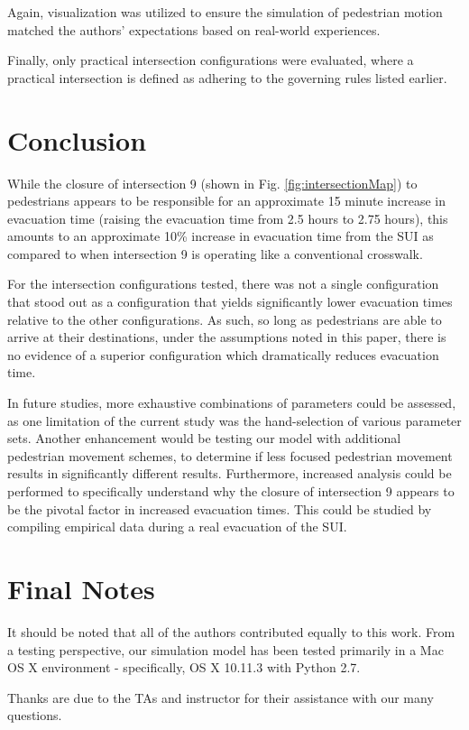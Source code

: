 \documentclass[12pt]{article}
\begin{document}
Again, visualization was utilized to ensure the simulation of pedestrian
motion matched the authors' expectations based on real-world experiences.

Finally, only practical intersection configurations were evaluated, where a practical
intersection is defined as adhering to the governing rules listed earlier.

\section{Conclusion}
While the closure of intersection 9 (shown in Fig. \ref{fig:intersectionMap})
to pedestrians appears to be responsible for an approximate 15 minute increase
in evacuation time (raising the evacuation time from 2.5 hours to 2.75 hours),
this amounts to an approximate 10\% increase in evacuation time from the SUI
as compared to when intersection 9 is operating like a conventional crosswalk.

For the intersection configurations tested, there was not a single configuration
that stood out as a configuration that yields significantly lower evacuation
times relative to the other configurations.  As such, so long as pedestrians are able
to arrive at their destinations, under the assumptions noted in this paper,
there is no evidence of a superior configuration which dramatically reduces
evacuation time.

In future studies, more exhaustive combinations of parameters could be
assessed, as one limitation of the current study was the hand-selection of
various parameter sets. Another enhancement would be testing our model with
additional pedestrian movement schemes, to determine if less focused pedestrian
movement results in significantly different results. Furthermore, increased
analysis could be performed to specifically understand why the closure of
intersection 9 appears to be the pivotal factor in increased evacuation times.
This could be studied by compiling empirical data during a real evacuation of
the SUI.

\section{Final Notes}
It should be noted that all of the authors contributed equally to this work.
From a testing perspective, our simulation model has been tested primarily in
a Mac OS X environment - specifically, OS X 10.11.3 with Python 2.7.

Thanks are due to the TAs and instructor for their assistance with our many
questions.

\clearpage
{}

\end{document}
